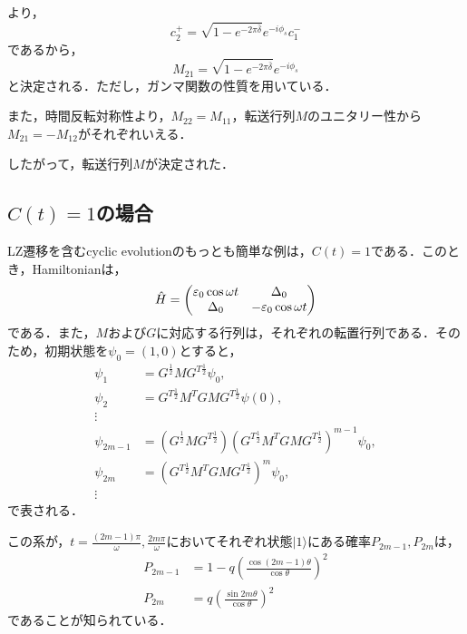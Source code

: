 より，
\begin{equation}
  c_2^+ = \sqrt{1 - e^{-2\pi \bar{\delta}}} e^{-i\phi_s} c_1^-
\end{equation}
であるから，
\begin{equation}
  M_{21} = \sqrt{1 - e^{-2\pi \bar{\delta}}} e^{-i\phi_s}
\end{equation}
と決定される．ただし，ガンマ関数の性質を用いている．


また，時間反転対称性より，$M_{22} = M_{11}$，転送行列$M$のユニタリー性から$M_{21} = -M_{12}$がそれぞれいえる．


したがって，転送行列$M$が決定された．

\subsection{$C(t) =1$の場合}
LZ遷移を含むcyclic evolutionのもっとも簡単な例は，$C(t) =1$である\cite{Kayanuma1994}．このとき，Hamiltonianは，
\begin{equation}
  \Hat{H} =
  \begin{pmatrix}
    \varepsilon_0 \cos \omega t & \Delta_0\\
    \Delta_0 & -\varepsilon_0 \cos \omega t
  \end{pmatrix} 
\end{equation}
である．また，$M$および$G$に対応する行列は，それぞれの転置行列である．そのため，初期状態を$\psi_0 = (1,0)$とすると，
\begin{align}
  \psi_1 &= G^{\frac{1}{2}} M G^{T \frac{1}{2}} \psi_0,\\
  \psi_2 &=  G^{T \frac{1}{2}} M^T G M G^{T \frac{1}{2}} \psi(0),\\
  \vdots\\
  \psi_{2m-1} &= (G^{\frac{1}{2}} M G^{T \frac{1}{2}}) (G^{T \frac{1}{2}} M^T G M G^{T \frac{1}{2}})^{m-1} \psi_0,\\
  \psi_{2m} &= (G^{T \frac{1}{2}} M^T G M G^{T \frac{1}{2}})^{m} \psi_0,\\
  \vdots
\end{align}
で表される．


この系が，$t = \frac{(2m-1)\pi}{\omega}, \frac{2m \pi}{\omega}$においてそれぞれ状態$|1\rangle$にある確率$P_{2m-1}, P_{2m}$は，
\begin{align}
  P_{2m-1} &= 1 - q \left( \frac{\cos(2m-1) \theta}{\cos\theta} \right)^2\\
  P_{2m} &= q \left( \frac{\sin 2m \theta}{\cos\theta} \right)^2
\end{align}
であることが知られている\cite{Kayanuma1994}．

